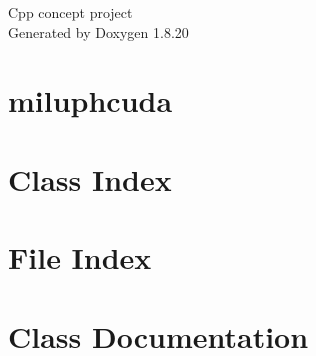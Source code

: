 \let\mypdfximage\pdfximage\def\pdfximage{\immediate\mypdfximage}\documentclass[twoside]{book}
\newcommand{\+}{\discretionary{\mbox{\scriptsize$\hookleftarrow$}}{}{}}
\newcommand{\clearemptydoublepage}{%
  \newpage{\pagestyle{empty}\cleardoublepage}%
}
\begin{document}
\hypersetup{pageanchor=false,
             bookmarksnumbered=true,
             pdfencoding=unicode
            }
\begin{titlepage}
\vspace*{7cm}
\begin{center}%
{\Large Cpp concept project }\\
\vspace*{1cm}
{\large Generated by Doxygen 1.8.20}\\
\end{center}
\end{titlepage}
\clearemptydoublepage
{}
\tableofcontents
\clearemptydoublepage
{}
\hypersetup{pageanchor=true}

\chapter{miluphcuda}
\label{index}\hypertarget{index}{}
\chapter{Class Index}

\chapter{File Index}

\chapter{Class Documentation}




\end{document}

